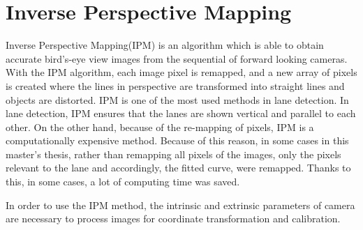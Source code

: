%
\section{Inverse Perspective Mapping}\label{sec:Inverse Perspective Mapping}
%
Inverse Perspective Mapping(IPM) is an algorithm which is able to obtain accurate bird's-eye view images from the sequential of forward looking cameras. With the IPM algorithm, each image pixel is remapped, and a new array of pixels is created where the lines in perspective are transformed into straight lines and objects are distorted. IPM is one of the most used methods in lane detection. In lane detection, IPM ensures that the lanes are shown vertical and parallel to each other. On the other hand, because of the re-mapping of pixels, IPM is a computationally expensive method. Because of this reason, in some cases in this master's thesis, rather than remapping all pixels of the images, only the pixels relevant to the lane and accordingly, the fitted curve, were remapped. Thanks to this, in some cases, a lot of computing time was saved.

In order to use the IPM method, the intrinsic and extrinsic parameters of camera are necessary to process images for coordinate transformation and calibration.

